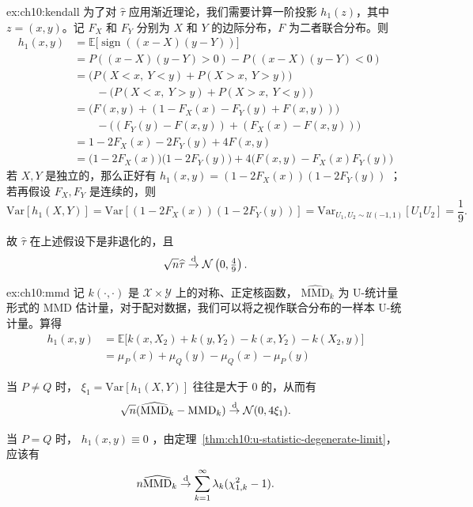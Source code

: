 \begin{examplecontinue}{ex:ch10:kendall}
为了对 $\widehat \tau$ 应用渐近理论，我们需要计算一阶投影 $h_1(z)$，其中 $z=(x,y)$。记 $F_X$ 和 $F_Y$ 分别为 $X$ 和 $Y$ 的边际分布，$F$ 为二者联合分布。则
\[\begin{aligned} h_1(x,y) &= \mathbb{E}\bigl[\operatorname{sign}((x-X)(y-Y))\bigr] \\ &= P((x-X)(y-Y) > 0) - P((x-X)(y-Y) < 0) \\ &= \bigl( P(X < x,\ Y < y) + P(X > x,\ Y > y) \bigr) \\ &\qquad - \bigl( P(X < x,\ Y > y) + P(X > x,\ Y < y) \bigr) \\ &= \bigl( F(x,y) + (1 - F_X(x) - F_Y(y) + F(x,y)) \bigr) \\ &\qquad - \bigl( (F_Y(y) - F(x,y)) + (F_X(x) - F(x,y)) \bigr) \\ &= 1 - 2F_X(x) - 2F_Y(y) + 4F(x,y) \\ &= \bigl(1-2F_X(x)\bigr)\bigl(1-2F_Y(y)\bigr) + 4\bigl(F(x,y) - F_X(x)F_Y(y)\bigr) \end{aligned}\]
若 $X,Y$ 是独立的，那么正好有 $h_1(x,y)=(1-2F_X(x))(1-2F_Y(y))$ ；若再假设 $F_X,F_Y$ 是连续的，则
\[
\mathrm{Var}[h_1(X,Y)]=\mathrm{Var}[(1-2F_X(x))(1-2F_Y(y))]=\mathrm{Var}_{U_1,U_2\sim\mathcal U(-1,1)}[U_1U_2]=\frac19.
\]

故 $\widehat\tau$ 在上述假设下是非退化的，且
\[
\sqrt n\widehat\tau\overset{\rm d}\to \mathcal N\left(0,\tfrac 49\right).
\]
\end{examplecontinue}


\begin{examplecontinue}[最大均值差异（续）]{ex:ch10:mmd}
记 $k(\cdot,\cdot)$ 是 $\mathscr X\times\mathscr Y$ 上的对称、正定核函数， $\widehat {\text{MMD}}_{k}$ 为 U-统计量形式的 MMD 估计量，对于配对数据，我们可以将之视作联合分布的一样本 U-统计量。算得\[ \begin{aligned} h_1(x,y) &= \mathbb{E}\bigl[k(x,X_2) + k(y,Y_2) - k(x,Y_2) - k(X_2,y)\bigr] \\ &= \mu_P(x) + \mu_Q(y) - \mu_Q(x)-\mu_P(y) \end{aligned} \]

当 $P\ne Q$ 时， $\xi_1=\mathrm {Var}[h_1(X,Y)]$ 往往是大于 0 的，从而有
\[
\sqrt n(\widehat{\text{MMD}}_k-\text{MMD}_k)\overset{\rm d}\to \mathcal N(0,4\xi_1).
\]

当 $P=Q$ 时， $h_1(x,y)\equiv0$ ，由定理~\ref{thm:ch10:u-statistic-degenerate-limit}，应该有
\[
n\widehat {\text{MMD}}_k\overset{\rm d}\to\sum_{k=1}^\infty\lambda_k(\chi_{1,k}^2-1).
\]
\end{examplecontinue}


